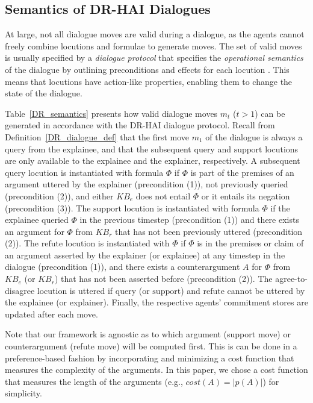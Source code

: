 \documentclass[letterpaper]{article} %
\begin{document}
\subsection{Semantics of DR-HAI Dialogues}

At large, not all dialogue moves are valid during a dialogue, as the agents cannot freely combine locutions and formulae to generate moves. The set of valid moves is usually specified by a \emph{dialogue protocol} that specifies the \emph{operational semantics} of the dialogue by outlining preconditions and effects for each locution \cite{plotkin1981structural}. This means that locutions have action-like properties, enabling them to change the state of the dialogue. 

 

 Table~\ref{DR_semantics} presents how valid dialogue moves $m_t$ ($t>1$) can be generated in accordance with the DR-HAI dialogue protocol. Recall from Definition~\ref{DR_dialogue_def} that the first move $m_1$ of the dialogue is always a $\mbox{query}$ from the explainee, and that the subsequent $\mbox{query}$ and $\mbox{support}$ locutions are only available to the explainee and the explainer, respectively. A subsequent $\mbox{query}$ locution is instantiated with formula $\Phi$ if $\Phi$ is part of the premises of an argument uttered by the explainer (precondition (1)), not previously queried (precondition (2)), and either $KB_e$ does not entail $\Phi$ or it entails its negation  (precondition (3)). The $\mbox{support}$ locution is instantiated with formula $\Phi$ if the explainee queried $\Phi$ in the previous timestep (precondition (1)) and there exists an argument for $\Phi$ from $KB_r$ that has not been previously uttered (precondition (2)). The $\mbox{refute}$ locution is instantiated with $\Phi$ if $\Phi$ is in the premises or claim of an argument asserted by the explainer (or explainee) at any timestep in the dialogue (precondition (1)), and there exists a counterargument $A$ for $\Phi$ from $KB_e$ (or $KB_r$) that has not been asserted before (precondition (2)). The \mbox{agree}-\mbox{to}-\mbox{disagree} locution is uttered if $\mbox{query}$ (or $\mbox{support}$) and $\mbox{refute}$ cannot be uttered by the explainee (or explainer). Finally, the respective agents' commitment stores are updated after each move. 

 Note that our framework is agnostic as to which argument (support move) or counterargument (refute move) will be computed first. This is can be done in a preference-based fashion by incorporating and minimizing a cost function that measures the complexity of the arguments. In this paper, we chose a cost function that measures the length of the arguments (e.g., $cost(A) = |p(A)|$) for simplicity.
\end{document}
